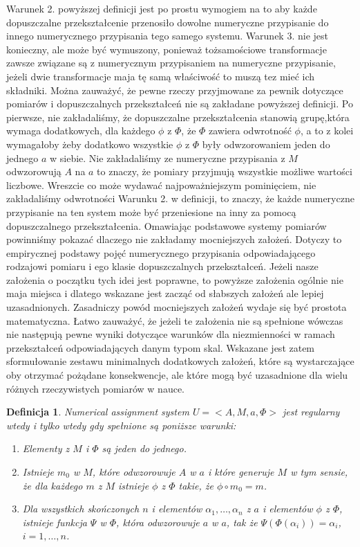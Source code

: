 \documentclass[12pt,a4paper]{report}
\newtheorem{definition}{Definicja}
\begin{document}
Warunek 2. powyższej definicji jest po prostu wymogiem na to aby każde dopuszczalne przekształcenie  przenosiło dowolne numeryczne przypisanie do innego numerycznego przypisania tego samego systemu. Warunek 3. nie jest konieczny, ale może być wymuszony, ponieważ tożsamościowe transformacje zawsze związane są z numerycznym przypisaniem na numeryczne przypisanie, jeżeli dwie transformacje maja tę samą właściwość to muszą tez mieć ich składniki. Można zauważyć, że pewne rzeczy przyjmowane za pewnik dotyczące pomiarów i dopuszczalnych przekształceń nie są zakładane  powyższej definicji. Po pierwsze, nie zakładaliśmy, że dopuszczalne przekształcenia stanowią grupę,która wymaga dodatkowych, dla każdego $\phi$ z $\Phi$, że $\Phi$ zawiera odwrotność $\phi$, a to z kolei wymagałoby żeby dodatkowo wszystkie $\phi$ z $\Phi$ były odwzorowaniem jeden do jednego $a$ w siebie. Nie zakładaliśmy ze numeryczne przypisania z $M$ odwzorowują $A$ na $a$ to znaczy, że pomiary przyjmują wszystkie możliwe wartości liczbowe. Wreszcie co może wydawać najpoważniejszym pominięciem, nie zakładaliśmy odwrotności Warunku 2. w definicji, to znaczy, że każde numeryczne przypisanie na ten system może być przeniesione na inny za pomocą dopuszczalnego przekształcenia. Omawiając podstawowe systemy pomiarów powinniśmy pokazać dlaczego nie zakładamy mocniejszych założeń. Dotyczy to empirycznej podstawy pojęć numerycznego przypisania odpowiadającego rodzajowi pomiaru i ego klasie dopuszczalnych przekształceń. Jeżeli nasze założenia o początku tych idei jest poprawne, to powyższe założenia ogólnie nie maja miejsca i dlatego wskazane jest zacząć od słabszych założeń ale lepiej uzasadnionych. Zasadniczy powód mocniejszych założeń wydaje się być prostota matematyczna. Łatwo zauważyć, że jeżeli te założenia nie są spełnione 
wówczas nie następują pewne wyniki dotyczące warunków dla niezmienności w ramach przekształceń odpowiadających danym typom skal. Wskazane jest zatem sformułowanie zestawu minimalnych dodatkowych założeń, które są wystarczające oby otrzymać pożądane konsekwencje, ale które mogą być uzasadnione dla wielu różnych rzeczywistych pomiarów w nauce.
\begin{definition}
Numerical assignment system $U=<A, M, a, \Phi>$ jest regularny wtedy i tylko wtedy gdy spełnione są poniższe warunki:
\begin{enumerate}
\item
Elementy z $M$ i $\Phi$ są jeden do jednego.
\item
Istnieje $m_{0}$ w $M$, które odwzorowuje $A$ w $a$ i które generuje $M$ w tym sensie, że dla każdego $m$ z $M$ istnieje $\phi$ z $\Phi$ takie, że $\phi \circ m_{0}=m$.
\item
Dla wszystkich skończonych $n$ i elementów $\alpha_{1},\dots,\alpha_{n}$ z $a$ i elementów $\phi$ z $\Phi$, istnieje funkcja $\Psi$ w $\Phi$, która odwzorowuje $a$ w $a$, tak że $\Psi(\Phi(\alpha_{i}))=\alpha_{i}$, $i=1,\ldots,n$.
\end{enumerate}
\end{definition}
\end{document}
